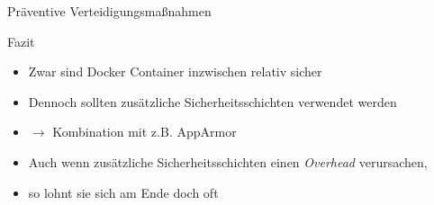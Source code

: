 \begin{frame}{Präventive Verteidigungsmaßnahmen}
        \begin{block}{Fazit}
                \begin{itemize}[<+->]
                        \item Zwar sind Docker Container inzwischen relativ sicher
                        \item Dennoch sollten zusätzliche Sicherheitsschichten verwendet werden
                        \item $\rightarrow$ Kombination mit z.B. AppArmor
                        \item Auch wenn zusätzliche Sicherheitsschichten einen \textit{Overhead} verursachen,
                        \item so lohnt sie sich am Ende doch oft 
                \end{itemize}
        \end{block}
\end{frame}

